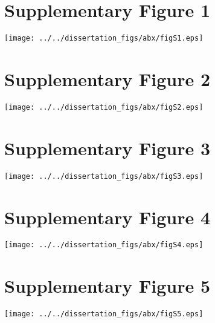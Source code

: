 \setcounter{figure}{0}

\section*{Supplementary Figure 1}
\begin{figure*}[h!]
	\centerline{
		\texttt{[image: ../../dissertation\_figs/abx/figS1.eps]}}
\end{figure*}



\newpage
\section*{Supplementary Figure 2}

\begin{figure*}[h!]
	\centerline{
		\texttt{[image: ../../dissertation\_figs/abx/figS2.eps]}}
	
\end{figure*}

\newpage
\section*{Supplementary Figure 3}

\begin{figure*}[h!]
	\centerline{
		\texttt{[image: ../../dissertation\_figs/abx/figS3.eps]}}
	
\end{figure*}


\newpage
\section*{Supplementary Figure 4}

\begin{figure*}[h!]
	\centerline{
		\texttt{[image: ../../dissertation\_figs/abx/figS4.eps]}}
	
\end{figure*}

\newpage
\section*{Supplementary Figure 5}

\begin{figure*}[h!]
	\centerline{
		\texttt{[image: ../../dissertation\_figs/abx/figS5.eps]}}
	
\end{figure*}

